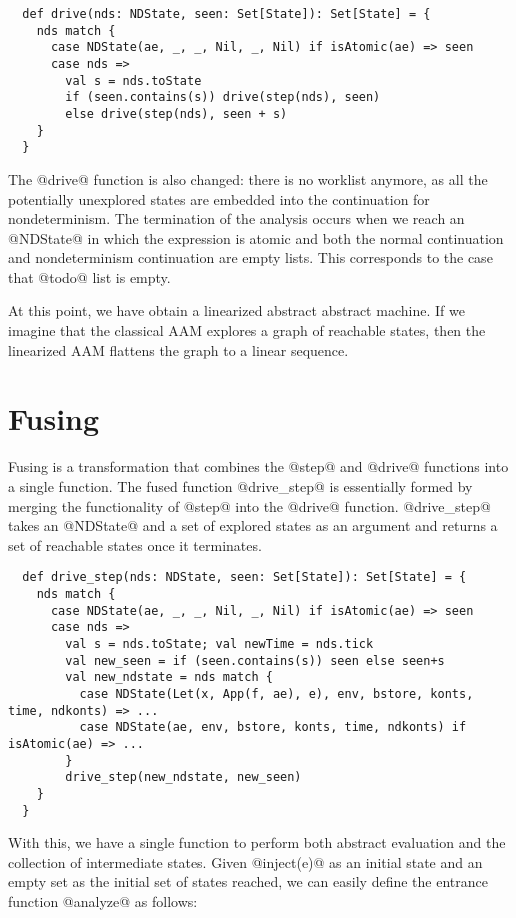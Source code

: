 \documentclass[acmsmall, review]{acmart}\settopmatter{}
\begin{document}
\begin{lstlisting}
  def drive(nds: NDState, seen: Set[State]): Set[State] = {
    nds match {
      case NDState(ae, _, _, Nil, _, Nil) if isAtomic(ae) => seen
      case nds =>
        val s = nds.toState
        if (seen.contains(s)) drive(step(nds), seen)
        else drive(step(nds), seen + s)
    }
  }
\end{lstlisting}

The @drive@ function is also changed: there is no worklist anymore, as all the
potentially unexplored states are embedded into the continuation for
nondeterminism.
The termination of the analysis occurs when we reach an @NDState@ in which the expression
is atomic and both the normal continuation and nondeterminism continuation are
empty lists. This corresponds to the case that @todo@ list is empty.

At this point, we have obtain a linearized abstract abstract machine. If we imagine that the
classical AAM explores a graph of reachable states, then the linearized AAM flattens the
graph to a linear sequence.

\section{Fusing} \label{fusing}

Fusing is a transformation that combines the @step@ and @drive@ functions into a single
function.
The fused function @drive_step@ is essentially formed by merging the functionality of
@step@ into the @drive@ function.
@drive_step@ takes an @NDState@ and a set of explored states as an argument
and returns a set of reachable states once it terminates.

\begin{lstlisting}
  def drive_step(nds: NDState, seen: Set[State]): Set[State] = {
    nds match {
      case NDState(ae, _, _, Nil, _, Nil) if isAtomic(ae) => seen
      case nds =>
        val s = nds.toState; val newTime = nds.tick
        val new_seen = if (seen.contains(s)) seen else seen+s
        val new_ndstate = nds match {
          case NDState(Let(x, App(f, ae), e), env, bstore, konts, time, ndkonts) => ...
          case NDState(ae, env, bstore, konts, time, ndkonts) if isAtomic(ae) => ...
        }
        drive_step(new_ndstate, new_seen)
    }
  }
\end{lstlisting}

With this, we have a single function to perform both abstract evaluation and the collection of
intermediate states. Given @inject(e)@ as an initial state and an empty set as the
initial set of states reached, we can easily define the entrance function @analyze@ as
follows:
\end{document}
